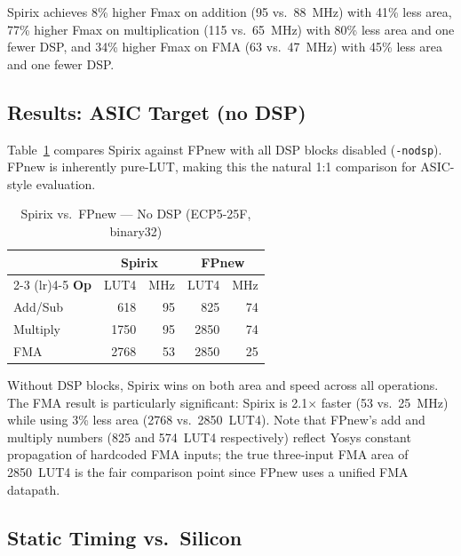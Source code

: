 \documentclass[10pt,twocolumn]{article}
\begin{document}
Spirix achieves 8\% higher Fmax on addition (95 vs.\ 88~MHz) with
41\% less area, 77\% higher Fmax on multiplication (115 vs.\ 65~MHz)
with 80\% less area and one fewer DSP, and 34\% higher Fmax on FMA
(63 vs.\ 47~MHz) with 45\% less area and one fewer DSP.

\subsection{Results: ASIC Target (no DSP)}

Table~\ref{tab:nodsp} compares Spirix against FPnew with all DSP
blocks disabled (\texttt{-nodsp}).  FPnew is inherently pure-LUT,
making this the natural 1:1 comparison for ASIC-style evaluation.

\begin{table}[t]
\centering
\caption{Spirix vs.\ FPnew --- No DSP (ECP5-25F, binary32)}
\label{tab:nodsp}
\small
\begin{tabular}{@{}l rr rr@{}}
\toprule
 & \multicolumn{2}{c}{\textbf{Spirix}} & \multicolumn{2}{c}{\textbf{FPnew}} \\
\cmidrule(lr){2-3} \cmidrule(lr){4-5}
\textbf{Op} & LUT4 & MHz & LUT4 & MHz \\
\midrule
Add/Sub & 618 & 95 & 825 & 74 \\
Multiply & 1750 & 95 & 2850 & 74 \\
FMA & 2768 & 53 & 2850 & 25 \\
\bottomrule
\end{tabular}
\end{table}

Without DSP blocks, Spirix wins on both area and speed across all
operations.  The FMA result is particularly significant: Spirix is
2.1$\times$ faster (53 vs.\ 25~MHz) while using 3\% less area
(2768 vs.\ 2850~LUT4).  Note that FPnew's add and multiply numbers
(825 and 574~LUT4 respectively) reflect Yosys constant propagation
of hardcoded FMA inputs; the true three-input FMA area of 2850~LUT4
is the fair comparison point since FPnew uses a unified FMA datapath.

\subsection{Static Timing vs.\ Silicon}
\end{document}
